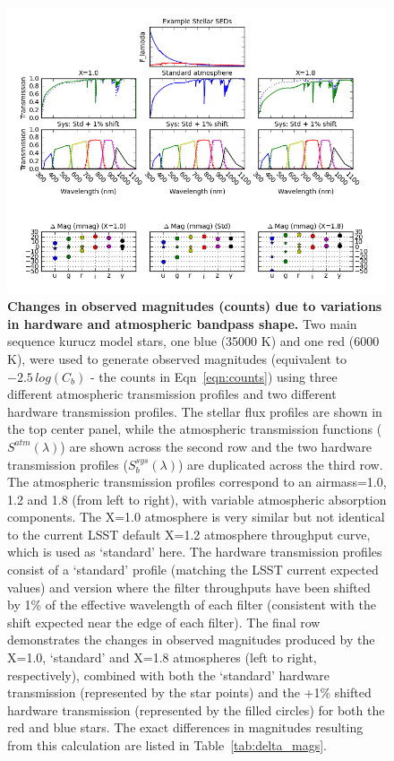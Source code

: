 \documentclass[12pt,preprint]{aastex}
\begin{document}
\begin{figure}[htbp]
\includegraphics[width=6in]{delta_mags}
\caption{ {\small {\bf Changes in observed magnitudes (counts) due to variations in
hardware and atmospheric bandpass shape.} Two main sequence kurucz model
stars, one blue (35000 K) and one red (6000 K), were used to generate
observed magnitudes (equivalent to $-2.5\, log(C_b)$ - the counts in
Eqn~\ref{eqn:counts}) using three different atmospheric transmission
profiles and two different hardware transmission profiles. The stellar
flux profiles are shown in the top center panel, while the atmospheric
transmission functions ($S^{atm}(\lambda)$) are shown across the
second row and the two hardware transmission profiles
($S_b^{sys}(\lambda)$) are duplicated across the third row. The
atmospheric transmission profiles correspond to an airmass=1.0, 1.2
and 1.8 (from left to right), with variable atmospheric absorption
components. The X=1.0 atmosphere is very similar but not
identical to the current LSST default X=1.2 atmosphere throughput
curve, which is used as `standard' here. The hardware transmission
profiles consist of a `standard' profile (matching the LSST current
expected values) and version where the filter throughputs have been
shifted by 1\% of the effective wavelength of each filter (consistent
with the shift expected near the edge of each filter). The final row
demonstrates the changes in observed magnitudes produced by the X=1.0,
`standard' and X=1.8 atmospheres (left to right, respectively),
combined with both the `standard' hardware transmission (represented by
the star points) and the +1\% shifted hardware transmission (represented
by the filled circles) for both the red and blue stars. The exact
differences in magnitudes resulting from this calculation are listed in
Table~\ref{tab:delta_mags}. }
\label{fig:delta_mags} }
\end{figure}
\end{document}
